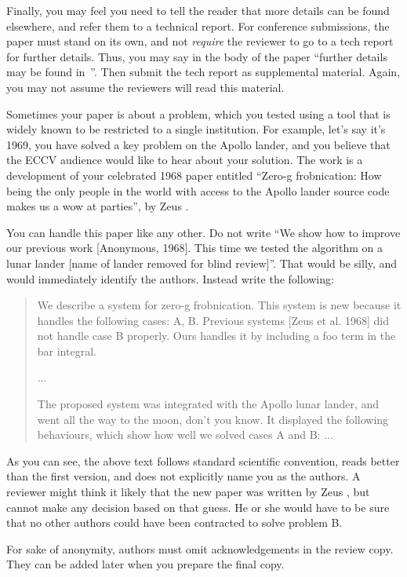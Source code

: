 \documentclass[runningheads]{llncs}
\begin{document}
Finally, you may feel you need to tell the reader that more details can be found elsewhere, and refer them to a technical report.
For conference submissions, the paper must stand on its own, and not \emph{require} the reviewer to go to a tech report for further details.
Thus, you may say in the body of the paper ``further details may be found in~\cite{Authors14b}''.
Then submit the tech report as supplemental material.
Again, you may not assume the reviewers will read this material.

Sometimes your paper is about a problem, which you tested using a tool that is widely known to be restricted to a single institution.
For example, let's say it's 1969, you have solved a key problem on the Apollo lander, and you believe that the ECCV audience would like to hear about your
solution.
The work is a development of your celebrated 1968 paper entitled ``Zero-g frobnication: How being the only people in the world with access to the Apollo lander source code makes us a wow at parties'', by Zeus \etal.

You can handle this paper like any other.
Do not write ``We show how to improve our previous work [Anonymous, 1968].
This time we tested the algorithm on a lunar lander [name of lander removed for blind review]''.
That would be silly, and would immediately identify the authors.
Instead write the following:
\begin{quotation}
   We describe a system for zero-g frobnication.
   This system is new because it handles the following cases:
   A, B.  Previous systems [Zeus et al. 1968] did not  handle case B properly.
   Ours handles it by including a foo term in the bar integral.

   ...

   The proposed system was integrated with the Apollo lunar lander, and went all the way to the moon, don't you know.
   It displayed the following behaviours, which show how well we solved cases A and B: ...
\end{quotation}
As you can see, the above text follows standard scientific convention, reads better than the first version, and does not explicitly name you as the authors.
A reviewer might think it likely that the new paper was written by Zeus \etal, but cannot make any decision based on that guess.
He or she would have to be sure that no other authors could have been contracted to solve problem B.

For sake of anonymity, authors must omit acknowledgements in the review copy. 
They can be added later when you prepare the final copy.
\end{document}
